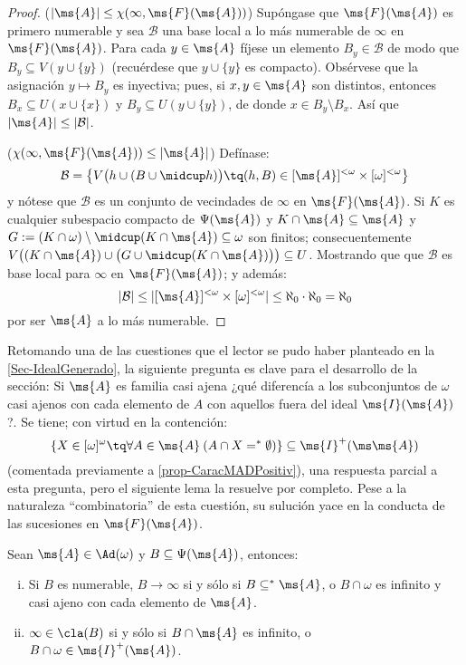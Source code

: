 	\begin{proof}
		($|\ms{A}|\leq \chi(\infty,\ms{F}(\ms{A}))$) Supóngase que $\ms{F}(\ms{A})$ es primero numerable y sea $\mathcal{B}$ una base local a lo más numerable de $\infty$ en $\ms{F}(\ms{A})$. Para cada $y \in \ms{A}$ fíjese un elemento $B_y \in \mathcal{B}$ de modo que $B_y \subseteq V(y \cup \{y\})$ (recuérdese que $y \cup \{y\}$ es compacto). Obsérvese que la asignación $y \mapsto B_y$ es inyectiva; pues, si $x,y \in \ms{A}$ son distintos, entonces $B_x \subseteq U(x \cup \{x\})$ y $B_y \subseteq U(y \cup \{y\})$, de donde $x \in B_y \setminus B_x$. Así que $ |\ms{A}| \leq |\mathcal{B}|$.
	
		($\chi(\infty,\ms{F}(\ms{A})) \leq |\ms{A}|$) Defínase:
		$$ \mathcal{B} = \big\{ V\big( h \cup (B \cup \midcup h) \big) \tq (h,B) \in [\ms{A}]^{<\omega} \times [\omega]^{<\omega} \big\} $$
		y nótese que $\mathcal{B}$ es un conjunto de vecindades de $\infty$ en $\ms{F}(\ms{A})$. Si $K$ es cualquier subespacio compacto de $\Psi(\ms{A})$ y $K \cap \ms{A} \subseteq \ms{A}$ y $G:=(K \cap \omega) \setminus \midcup (K \cap \ms{A}) \subseteq \omega$ son finitos; consecuentemente $V\big( (K \cap \ms{A}) \cup \big( G \cup \midcup (K \cap \ms{A}) \big) \big) \subseteq U $. Mostrando que que $\mathcal{B}$ es base local para $\infty$ en $\ms{F}(\ms{A})$; y además:
		$$ |\mathcal{B}| \leq | [\ms{A}]^{<\omega} \times [\omega]^{<\omega} | \leq \aleph_0 \cdot \aleph_0 = \aleph_0  $$
		por ser $\ms{A}$ a lo más numerable.
	\end{proof}

	Retomando una de las cuestiones que el lector se pudo haber planteado en la \autoref{Sec-IdealGenerado}, la siguiente pregunta es clave para el desarrollo de la sección: Si $\ms{A}$ es familia casi ajena ¿qué diferencía a los subconjuntos de $\omega$ casi ajenos con cada elemento de $A$ con aquellos fuera del ideal $\ms{I}(\ms{A})$?. Se tiene; con virtud en la contención:
	\[ \{X \in [\omega]^{\omega} \tq \forall A \in \ms{A} \: (A \cap X =^* \emptyset) \} \subseteq \ms{I}^+(\ms\ms{A}) \]
	(comentada previamente a \ref{prop-CaracMADPositiv}), una respuesta parcial a esta pregunta, pero el siguiente lema la resuelve por completo. Pese a la naturaleza ``combinatoria'' de esta cuestión, su sulución yace en la conducta de las sucesiones en $\ms{F}(\ms{A})$.

	\begin{lema}\label{lem-convClave}
		Sean $\ms{A}\in \Ad(\omega)$ y $B \subseteq \Psi(\ms{A})$, entonces:
		\begin{enumerate}[i)]
			\item Si $B$ es numerable, $B \to \infty$ si y sólo si $B \subseteq^* \ms{A}$, o $B \cap \omega$ es infinito y casi ajeno con cada elemento de $\ms{A}$.
			\item $\infty \in \cla(B)$ si y sólo si $B \cap \ms{A}$ es infinito, o $B \cap \omega \in \ms{I}^+(\ms{A})$.
		\end{enumerate}
	\end{lema}

